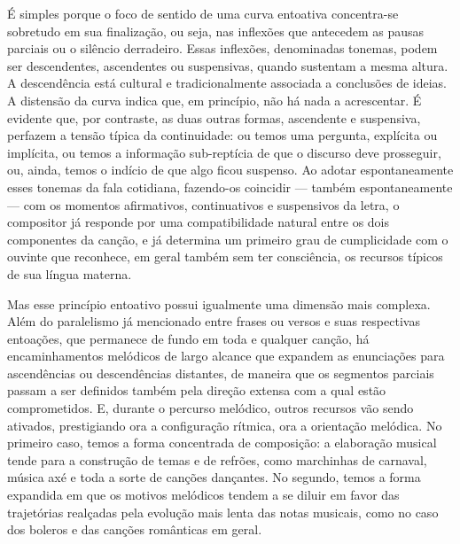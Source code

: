 É simples porque o foco de sentido de uma curva entoativa concentra-se
sobretudo em sua finalização, ou seja, nas inflexões que antecedem as
pausas parciais ou o silêncio derradeiro. Essas inflexões, denominadas
tonemas, podem ser descendentes, ascendentes ou suspensivas, quando
sustentam a mesma altura. A descendência está cultural e
tradicionalmente associada a conclusões de ideias. A distensão da curva
indica que, em princípio, não há nada a acrescentar. É evidente que, por
contraste, as duas outras formas, ascendente e suspensiva, perfazem a
tensão típica da continuidade: ou temos uma pergunta, explícita ou
implícita, ou temos a informação sub-reptícia de que o discurso deve
prosseguir, ou, ainda, temos o indício de que algo ficou suspenso. Ao
adotar espontaneamente esses tonemas da fala cotidiana, fazendo-os
coincidir --- também espontaneamente --- com os momentos afirmativos,
continuativos e suspensivos da letra, o compositor já responde por uma
compatibilidade natural entre os dois componentes da canção, e já
determina um primeiro grau de cumplicidade com o ouvinte que reconhece,
em geral também sem ter consciência, os recursos típicos de sua língua
materna.

Mas esse princípio entoativo possui igualmente uma dimensão mais
complexa. Além do paralelismo já mencionado entre frases ou versos e
suas respectivas entoações, que permanece de fundo em toda e qualquer
canção, há encaminhamentos melódicos de largo alcance que expandem as
enunciações para ascendências ou descendências distantes, de maneira que
os segmentos parciais passam a ser definidos também pela direção extensa
com a qual estão comprometidos. E, durante o percurso melódico, outros
recursos vão sendo ativados, prestigiando ora a configuração rítmica,
ora a orientação melódica. No primeiro caso, temos a forma concentrada
de composição: a elaboração musical tende para a construção de temas e
de refrões, como marchinhas de carnaval, música axé e toda a sorte de
canções dançantes. No segundo, temos a forma expandida em que os
motivos melódicos tendem a se diluir em favor das trajetórias realçadas
pela evolução mais lenta das notas musicais, como no caso dos boleros e
das canções românticas em geral.

